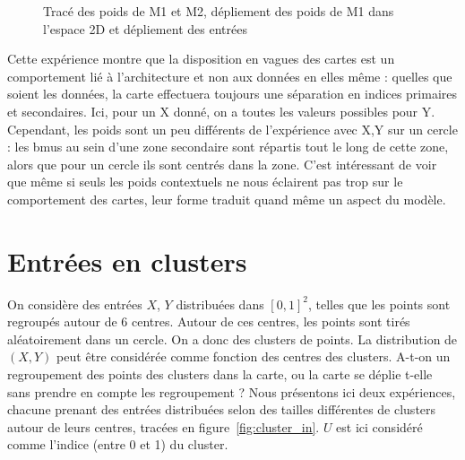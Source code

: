 \begin{figure}[h!]
\begin{minipage}{0.33\textwidth}
\end{minipage}
\label{fig:2som_square}
\caption{Tracé des poids de M1 et M2, dépliement des poids de M1 dans l'espace 2D et dépliement des entrées}
\end{figure}

Cette expérience montre que la disposition en vagues des cartes est un comportement lié à l'architecture et non aux données en elles même : quelles que soient les données, la carte effectuera toujours une séparation en indices primaires et secondaires. Ici, pour un X donné, on a toutes les valeurs possibles pour Y.
Cependant, les poids sont un peu différents de l'expérience avec X,Y sur un cercle : les bmus au sein d'une zone secondaire sont répartis tout le long de cette zone, alors que pour un cercle ils sont centrés dans la zone.
C'est intéressant de voir que même si seuls les poids contextuels ne nous éclairent pas trop sur le comportement des cartes, leur forme traduit quand même un aspect du modèle. 


\section{Entrées en clusters}

On considère des entrées $X$, $Y$ distribuées dans $[0,1]^2$, telles que les points sont regroupés autour de 6 centres. Autour de ces centres, les points sont tirés aléatoirement dans un cercle. On a donc des clusters de points. La distribution de $(X,Y)$ peut être considérée comme fonction des centres des clusters.  A-t-on un regroupement des points des clusters dans la carte, ou la carte se déplie t-elle sans prendre en compte les regroupement ? Nous présentons ici deux expériences, chacune prenant des entrées distribuées selon des tailles différentes de clusters autour de leurs centres, tracées en figure~\ref{fig:cluster_in}.  $U$ est ici considéré comme l'indice (entre 0 et 1) du cluster.

